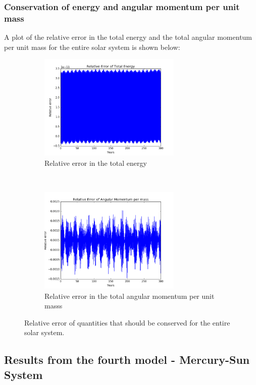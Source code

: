 \documentclass[a4paper, 10pt]{article}
\begin{document}
\subsubsection{Conservation of energy and angular momentum per unit mass}
A plot of the relative error in the total energy and the total angular momentum per unit mass for the entire solar system is shown below:
\begin{figure}[!ht]
    \centering
    \begin{subfigure}[H!]{0.5\textwidth}
        \centering
        \includegraphics[height=2.0in]{relErrEnFull.png}
        \caption{Relative error in the total energy}
    \end{subfigure}%
    ~ 
    \begin{subfigure}[H!]{0.5\textwidth}
        \centering
        \includegraphics[height=2.0in]{relErrMomFull.png}
        \caption{Relative error in the total angular momentum per unit masss}
    \end{subfigure}
    \caption{Relative error of quantities that should be conserved for the entire solar system.} \label{fig:error_full_solar_system}
\end{figure}
\newpage

\subsection{Results from the fourth model - Mercury-Sun System}
\end{document}
